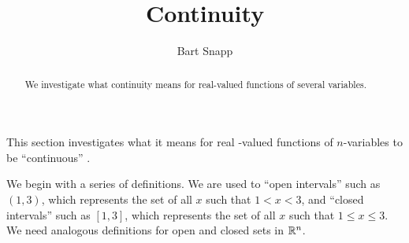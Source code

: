 \documentclass{ximera}
\author{Bart Snapp}
\title[Dig-In:]{Continuity}
\begin{document}
\begin{abstract}
We investigate what continuity means for real-valued functions of several variables.
\end{abstract}
\maketitle


This section investigates what it means for real -valued functions of $n$-variables to be ``continuous'' .

We begin with a series of definitions. We are
used to ``open intervals'' such as $(1,3)$, which represents the set
of all $x$ such that $1<x<3$, and ``closed intervals'' such as
$[1,3]$, which represents the set of all $x$ such that $1\leq x\leq
3$. We need analogous definitions for open and closed sets in $\mathbb R^n$.
\end{document}
